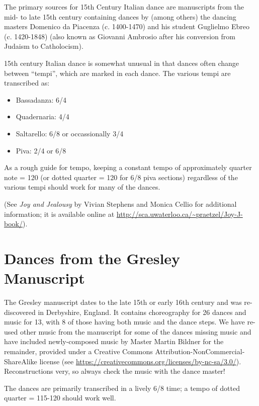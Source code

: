\documentclass[11pt]{book}
\begin{document}
The primary sources for 15th Century Italian dance are manuscripts from the
mid- to late 15th century containing dances by (among others) the dancing
masters Domenico da Piacenza (c. 1400-1470) and his student Guglielmo Ebreo (c.
1420-1848) (also known as Giovanni Ambrosio after his conversion from Judaism
to Catholocism).

15th century Italian dance is somewhat unusual in that dances often change
between ``tempi'', which are marked in each dance. The various tempi are
transcribed as:

\begin{itemize}

\item Bassadanza: 6/4
\item Quadernaria: 4/4
\item Saltarello: 6/8 or occassionally 3/4
\item Piva: 2/4 or 6/8

\end{itemize}

As a rough guide for tempo, keeping a constant tempo of approximately quarter
note = 120 (or dotted quarter = 120 for 6/8 piva sections) regardless of the
various tempi should work for many of the dances.

(See {\em Joy and Jealousy} by Vivian Stephens and Monica Cellio for additional
information; it is available online at
\url{http://sca.uwaterloo.ca/~praetzel/Joy-J-book/}). 


\clearpage


\chapter{Dances from the Gresley Manuscript}

The Gresley manuscript dates to the late 15th or early 16th century and was
re-discovered in Derbyshire, England. It contains choreography for 26 dances
and music for 13, with 8 of those having both music and the dance steps. We
have re-used other music from the manuscript for some of the dances missing
music and have included newly-composed music by Master Martin Bildner for the remainder, provided
under a Creative Commons Attribution-NonCommercial-ShareAlike license (see 
\url{https://creativecommons.org/licenses/by-nc-sa/3.0/}).
Reconstructions very, so always check the music with the dance master!

The dances are primarily transcribed in a lively 6/8 time; a tempo of dotted
quarter = 115-120 should work well.
\end{document}
